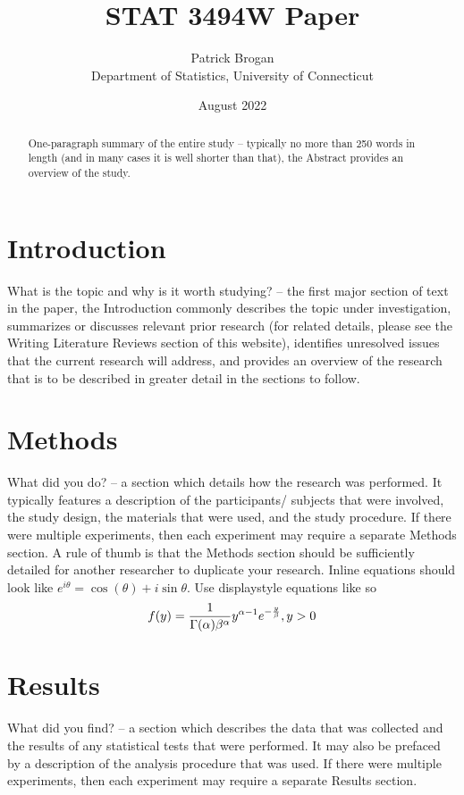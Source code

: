 \documentclass[12pt, letterpaper, twoside]{article}
\title{STAT 3494W Paper}
\author{Patrick Brogan\\[1ex]
  Department of Statistics, University of Connecticut\\}
\date{August 2022}
\begin{document}
\maketitle

\begin{abstract}
One-paragraph summary of the entire study – typically no more than
250 words in length (and in many cases it is well shorter than that),
the Abstract provides an overview of the study.
\end{abstract}

\section*{Introduction}
What is the topic and why is it worth studying? – the first major
section of text in the paper, the Introduction commonly describes
the topic under investigation, summarizes or discusses relevant
prior research (for related details, please see the Writing Literature
Reviews section of this website), identifies unresolved issues that
the current research will address, and provides an overview of the
research that is to be described in greater detail in the sections to
follow.

\section*{Methods}
What did you do? – a section which details how the research was
performed.  It typically features a description of the participants/
subjects that were involved, the study design, the materials that were
used, and the study procedure.  If there were multiple experiments,
then each experiment may require a separate Methods section.  A rule
of thumb is that the Methods section should be sufficiently detailed
for another researcher to duplicate your research. Inline equations should look like \(e^{i\theta} = \cos(\theta) + i\sin\theta\). Use displaystyle equations like so \begin{equation}
  \label{eq:ks_standard}
  f(y) = \frac{1}{\Gamma(\alpha)\beta^\alpha}\*y^{\alpha-1}e^{-\frac{y}{\beta}}, y > 0
\end{equation}

\section*{Results}
What did you find? – a section which describes the data that was
collected and the results of any statistical tests that were performed.
It may also be prefaced by a description of the analysis procedure that
was used. If there were multiple experiments, then each experiment may
require a separate Results section.
\end{document}
